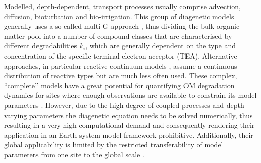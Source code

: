 \documentclass[gmd, manuscript]{copernicus}
\begin{document}
Modelled, depth-dependent, transport processes usually comprise advection, diffusion, bioturbation and bio-irrigation.   
This group of diagenetic models generally uses a so-called multi-G approach \citep{joergensen_comparison_1978_2, berner_early_1980}, thus dividing the bulk organic 
matter pool into a number of compound classes that are characterised by different degradabilities $k_i$, which are generally dependent on the type and concentration 
of the specific terminal electron acceptor (TEA). 
Alternative approaches, in particular reactive continuum models \citep{boudreau_reactive_1991}, assume a continuous distribution of reactive types but are much less often used. 
These complex, ``complete'' models have a great potential for quantifying OM degradation dynamics for sites where enough observations are available to constrain its model 
parameters \citep[see e.g.][for applications]{boudreau_comparative_1998, wang_multicomponent_1996, thullner_global_scale_2009}. 
However, due to the high degree of coupled processes and depth-varying parameters the diagenetic equation needs to be %
solved numerically, thus resulting in a very high computational demand and consequently rendering their application in an Earth system model framework prohibitive. 
Additionally, their global applicability is limited by the restricted transferability of model parameters from one site to the global scale \citep{arndt_quantifying_2013}. 
\end{document}

